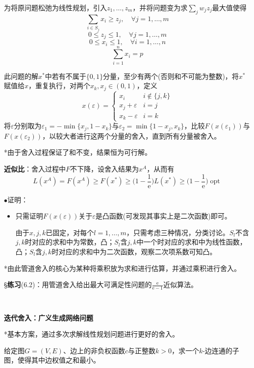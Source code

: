 \documentclass[a4paper,UTF8,fontset=windows]{ctexart}
\newcommand{\exce}[2]{\S\textbf{练习}(#1)：{\kaishu #2}}
\newcommand{\proo}[1]{{\kaishu $\bullet$证明：
\begin{itemize}
    \item[] #1
\end{itemize}
}}
\DeclareMathOperator*{\opt}{opt}
\newcommand{\er}{\mathrm{e}}
\begin{document}
为将原问题松弛为线性规划，引入$z_1,\dots,z_m$，并将问题变为求$\sum_jw_jz_j$最大值使得
$$\sum_{i\in S_j}x_i\ge z_j,\quad\forall j=1,\dots,m$$
$$0\le z_j\le1,\quad\forall j=1,\dots,m$$
$$0\le x_i\le1,\quad\forall i=1,\dots,n$$
$$\sum_{i=1}^nx_i=p$$

此问题的解$x^*$中若有不属于$\{0,1\}$分量，至少有两个(否则和不可能为整数)，将$x^*$赋值给$x$，重复执行，对两个$x_k,x_j\in(0,1)$，定义
$$x(\varepsilon)=\begin{cases}x_i&i\notin\{j,k\}\\x_j+\varepsilon&i=j\\x_k-\varepsilon&i=k\end{cases}$$
将$\varepsilon$分别取为$\varepsilon_1=-\min\{x_j,1-x_k\}$与$\varepsilon_2=\min\{1-x_j,x_k\}$，比较$F(x(\varepsilon_1))$与$F(x(\varepsilon_2))$，以较大者进行这两个分量的舍入，直到所有分量被舍入。

*由于舍入过程保证了和不变，结果恒为可行解。

\textbf{近似比}：舍入过程中$F$不下降，设舍入结果为$x^A$，从而有
$$L(x^A)=F(x^A)\ge F(x^*)\ge\bigg(1-\frac{1}{\er}\bigg)L(x^*)\ge\bigg(1-\frac{1}{\er}\bigg)\opt$$

\proo{
    只需证明$F(x(\varepsilon))$关于$\varepsilon$是凸函数(可发现其事实上是二次函数)即可。

    由于$x,j,k$已固定，对每个$l=1,\dots,m$，只需考虑三种情况，分类讨论。$S_l$不含$j,k$时对应的求和中为常数，凸；$S_l$含$j,k$中一个时对应的求和中为线性函数，凸；$S_l$含$j,k$时对应的求和中为二次函数，观察二次项系数可知凸。
}

*由此管道舍入的核心为某种将乘积放为求和进行估算，并通过乘积进行舍入。

\exce{6.2}{用管道舍入给出最大可满足性问题的$\frac{\er}{\er-1}$近似算法。}

\

\textbf{迭代舍入：广义生成网络问题}

*基本方案，通过多次求解线性规划问题进行更好的舍入。

给定图$G=(V,E)$、边上的非负权函数$c$与正整数$k>0$，求一个$k$-边连通的子图，使得其中边权值之和最小。
\end{document}
